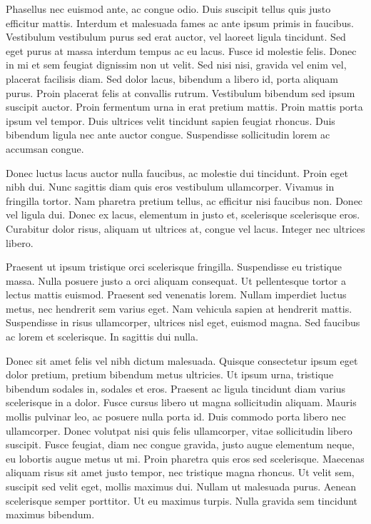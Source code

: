 Phasellus nec euismod ante, ac congue odio. Duis suscipit tellus quis justo efficitur mattis. Interdum et malesuada fames ac ante ipsum primis in faucibus. Vestibulum vestibulum purus sed erat auctor, vel laoreet ligula tincidunt. Sed eget purus at massa interdum tempus ac eu lacus. Fusce id molestie felis. Donec in mi et sem feugiat dignissim non ut velit. Sed nisi nisi, gravida vel enim vel, placerat facilisis diam. Sed dolor lacus, bibendum a libero id, porta aliquam purus. Proin placerat felis at convallis rutrum. Vestibulum bibendum sed ipsum suscipit auctor. Proin fermentum urna in erat pretium mattis. Proin mattis porta ipsum vel tempor. Duis ultrices velit tincidunt sapien feugiat rhoncus. Duis bibendum ligula nec ante auctor congue. Suspendisse sollicitudin lorem ac accumsan congue.

Donec luctus lacus auctor nulla faucibus, ac molestie dui tincidunt. Proin eget nibh dui. Nunc sagittis diam quis eros vestibulum ullamcorper. Vivamus in fringilla tortor. Nam pharetra pretium tellus, ac efficitur nisi faucibus non. Donec vel ligula dui. Donec ex lacus, elementum in justo et, scelerisque scelerisque eros. Curabitur dolor risus, aliquam ut ultrices at, congue vel lacus. Integer nec ultrices libero.

Praesent ut ipsum tristique orci scelerisque fringilla. Suspendisse eu tristique massa. Nulla posuere justo a orci aliquam consequat. Ut pellentesque tortor a lectus mattis euismod. Praesent sed venenatis lorem. Nullam imperdiet luctus metus, nec hendrerit sem varius eget. Nam vehicula sapien at hendrerit mattis. Suspendisse in risus ullamcorper, ultrices nisl eget, euismod magna. Sed faucibus ac lorem et scelerisque. In sagittis dui nulla.

Donec sit amet felis vel nibh dictum malesuada. Quisque consectetur ipsum eget dolor pretium, pretium bibendum metus ultricies. Ut ipsum urna, tristique bibendum sodales in, sodales et eros. Praesent ac ligula tincidunt diam varius scelerisque in a dolor. Fusce cursus libero ut magna sollicitudin aliquam. Mauris mollis pulvinar leo, ac posuere nulla porta id. Duis commodo porta libero nec ullamcorper. Donec volutpat nisi quis felis ullamcorper, vitae sollicitudin libero suscipit. Fusce feugiat, diam nec congue gravida, justo augue elementum neque, eu lobortis augue metus ut mi. Proin pharetra quis eros sed scelerisque. Maecenas aliquam risus sit amet justo tempor, nec tristique magna rhoncus. Ut velit sem, suscipit sed velit eget, mollis maximus dui. Nullam ut malesuada purus. Aenean scelerisque semper porttitor. Ut eu maximus turpis. Nulla gravida sem tincidunt maximus bibendum.


